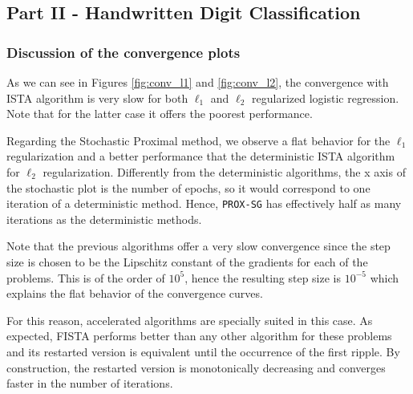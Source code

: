 \documentclass{article}
\begin{document}
\subsection*{Part II - Handwritten Digit Classification}

\subsubsection*{Discussion of the convergence plots}
As we can see in Figures \ref{fig:conv_l1} and \ref{fig:conv_l2}, the convergence with ISTA algorithm is very slow for both $\ell_1$ and $\ell_2$ regularized logistic regression. Note that for the latter case it offers the poorest performance.

Regarding the Stochastic Proximal method, we observe a flat behavior for the $\ell_1$ regularization and a better performance that the deterministic ISTA algorithm for $\ell_2$ regularization. Differently from the deterministic algorithms, the x axis of the stochastic plot is the number of epochs, so it would correspond to one iteration of a deterministic method. Hence, \texttt{PROX-SG} has effectively half as many iterations as the deterministic methods.

Note that the previous algorithms offer a very slow convergence since the step size is chosen to be the Lipschitz constant of the gradients for each of the problems. This is of the order of $10^5$, hence the resulting step size is $10^{-5}$ which explains the flat behavior of the convergence curves.

For this reason, accelerated algorithms are specially suited in this case. As expected, FISTA performs better than any other algorithm for these problems and its restarted version is equivalent until the occurrence of the first ripple. By construction, the restarted version is monotonically decreasing and converges faster in the number of iterations.
\end{document}
